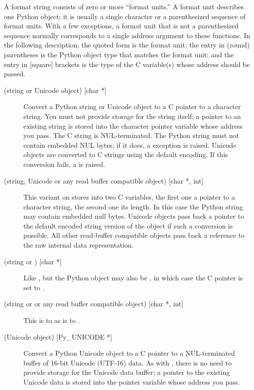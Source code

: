 A format string consists of zero or more ``format units.''  A format
unit describes one Python object; it is usually a single character or
a parenthesized sequence of format units.  With a few exceptions, a
format unit that is not a parenthesized sequence normally corresponds
to a single address argument to these functions.  In the following
description, the quoted form is the format unit; the entry in (round)
parentheses is the Python object type that matches the format unit;
and the entry in [square] brackets is the type of the C variable(s)
whose address should be passed.

\begin{description}
  \item[ (string or Unicode object) {[char *]}]
  Convert a Python string or Unicode object to a C pointer to a
  character string.  You must not provide storage for the string
  itself; a pointer to an existing string is stored into the character
  pointer variable whose address you pass.  The C string is
  NUL-terminated.  The Python string must not contain embedded NUL
  bytes; if it does, a  exception is raised.
  Unicode objects are converted to C strings using the default
  encoding.  If this conversion fails, a  is
  raised.

  \item[ (string, Unicode or any read buffer compatible object)
  {[char *, int]}]
  This variant on  stores into two C variables, the first one
  a pointer to a character string, the second one its length.  In this
  case the Python string may contain embedded null bytes.  Unicode
  objects pass back a pointer to the default encoded string version of
  the object if such a conversion is possible.  All other read-buffer
  compatible objects pass back a reference to the raw internal data
  representation.

  \item[ (string or ) {[char *]}]
  Like , but the Python object may also be , in
  which case the C pointer is set to \NULL.

  \item[ (string or  or any read buffer
  compatible object) {[char *, int]}]
  This is to  as  is to .

  \item[ (Unicode object) {[Py_UNICODE *]}]
  Convert a Python Unicode object to a C pointer to a NUL-terminated
  buffer of 16-bit Unicode (UTF-16) data.  As with , there is
  no need to provide storage for the Unicode data buffer; a pointer to
  the existing Unicode data is stored into the 
  pointer variable whose address you pass.


\end{description}

